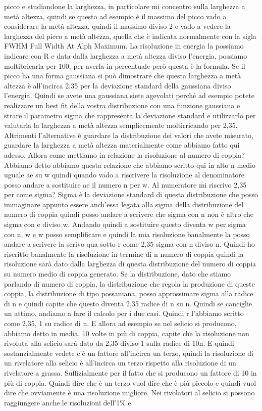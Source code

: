 {picco e studiandone la larghezza, in particolare mi concentro sulla larghezza a metà altezza, quindi se questo ad esempio è il massimo del picco vado a considerare la metà altezza, quindi il massimo diviso 2 e vado a vedere la larghezza del picco a metà altezza, quella che è indicata normalmente con la sigla FWHM Full Width At Alph Maximum. La risoluzione in energia la possiamo indicare con R e data dalla larghezza a metà altezza diviso l'energia, possiamo moltibricarla per 100, per averla in percentuale però questa è la formula. Se il picco ha una forma gaussiana si può dimostrare che questa larghezza a metà altezza è all'incirca 2,35 per la deviazione standard della gaussiana diviso l'energia. Quindi se avete una gaussiana siete agevolati perché ad esempio potete realizzare un best fit della vostra distribuzione con una funzione gaussiana e strare il parametro sigma che rappresenta la deviazione standard e utilizzarlo per valutarla la larghezza a metà altezza semplicemente moltirricando per 2,35. Altrimenti l'alternative è guardare la distribuzione dei valori che avete misurato, guardare la larghezza a metà altezza materialmente come abbiamo fatto qui adesso. Allora come mettiamo in relazione la risoluzione al numero di coppia? Abbiamo detto abbiamo questa relazione che abbiamo scritto qui in alto n medio uguale ae su w quindi quando vado a riscrivere la risoluzione al denominatore posso andare a sostituire ae il numero n per w. Al numeratore mi riscrivo 2,35 per come sigma? Sigma è la deviazione standard di questa distribuzione che posso immaginare appunto essere anch'essa legata alla sigma della distribuzione del numero di coppia quindi posso andare a scrivere che sigma con n non è altro che sigma con e diviso w. Andando quindi a sostituire questo diventa w per sigma con n, w e w posso semplificare e quindi la mia risoluzione banalmente la posso andare a scrivere la scrivo qua sotto r come 2,35 sigma con n diviso n. Quindi ho riscritto banalmente la risoluzione in termine di n numero di coppia quindi la risoluzione sarà dato dalla larghezza di questa distribuzione del numero di coppia su numero medio di coppia generato. Se la distribuzione, dato che stiamo parlando di numero di coppia, la distribuzione che regola la produzione di queste coppia, la distribuzione di tipo possaniana, posso approssimare sigma alla radice di n e quindi capite che questo diventa 2,35 radice di n su n. Quindi se canciglie un attimo, andiamo a fare il calcolo per i due casi. Quindi r l'abbiamo scritto come 2,35, 1 su radice di n. E allora ad esempio se nel selicio si producono, abbiamo detto in media, 10 volte in più di coppia, capite che la risoluzione non rivoluta alla selicio sarà dato da 2,35 diviso 1 sulla radice di 10n. E quindi sostanzialmente vedete c'è un fattore all'incirca un terzo, quindi la risoluzione di un rivelatore alla selicio è all'incirca un terzo rispetto alla risoluzione di un rivelatore a grassa. Suffizialmente per il fatto che si producono un fattore di 10 in più di coppia. Quindi dire che è un terzo vuol dire che è più piccolo e quindi vuol dire che ovviamente è una risoluzione migliore. Nei rivolatori al selicio si possono raggiungere anche le risoluzioni dell'1\% e 

}
